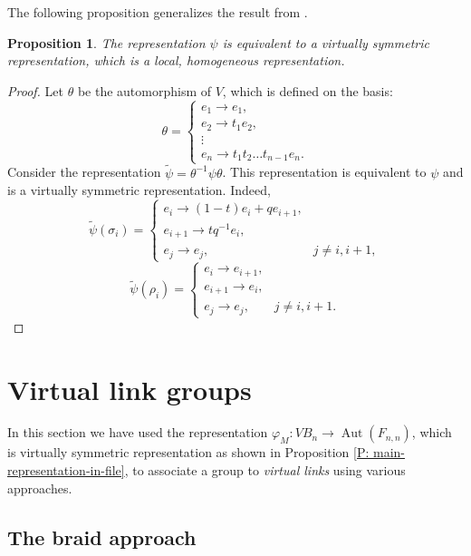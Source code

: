 \documentclass[11 pt, reqno]{amsart}
\newtheorem{proposition}[theorem]{Proposition}
\theoremstyle{definition}
\numberwithin{equation}{subsection}
\newcommand{\Aut}{\operatorname{Aut}}
\begin{document}
The following proposition generalizes the result from \cite{BF-2}.

\begin{proposition}\label{P: Proposition2}
The representation $\psi$ is equivalent to a virtually symmetric representation, which is a local, homogeneous representation.
\end{proposition}

\begin{proof}
Let $\theta$ be the automorphism of $V$, which is defined on the basis:
$$
\theta =  \left\{
\begin{array}{l}
e_1 \to    e_{1},    \\
e_2 \to t_1 e_2,  \\
\vdots  \\
e_n \to t_1 t_2 \ldots t_{n-1} e_n.
\end{array}
\right.
$$
Consider the representation $\tilde{\psi} = \theta^{-1} \psi \theta$. This representation is equivalent to $\psi$ and is a virtually symmetric representation. Indeed,
$$
\tilde{\psi}(\sigma_i) =  \left\{
\begin{array}{ll}
e_i \to  (1-t) e_i + q  e_{i+1}, &   \\
e_{i+1} \to t  q^{-1} e_i, & \\
e_j \to e_j, & j \not= i, i+1,
\end{array}
\right.
$$
$$
\tilde{\psi}(\rho_i) =  \left\{
\begin{array}{ll}
e_i \to    e_{i+1}, &   \\
e_{i+1} \to  e_i, & \\
e_j \to e_j, & j \not= i, i+1.
\end{array}
\right.
$$
\end{proof}


\medskip



\section{Virtual link groups}\label{S: Virtual link groups}

In this section we have used the representation  $\varphi_M:VB_n \to \Aut(F_{n,n})$, which is virtually symmetric representation as shown in Proposition \ref{P: main-representation-in-file}, to associate a group to {\it virtual links} using various approaches.
\par

\subsection{The braid approach}\label{SS: The braid approach}
\end{document}
